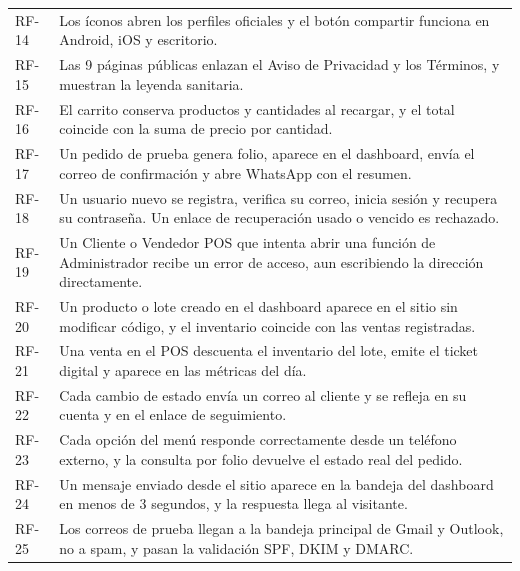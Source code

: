 \documentclass[11pt,letterpaper]{article}
\begin{document}
\begin{longtable}{@{} L{1.9cm} L{13.9cm} @{}}
RF-14 & Los íconos abren los perfiles oficiales y el botón compartir funciona en Android, iOS y escritorio. \\
RF-15 & Las 9 páginas públicas enlazan el Aviso de Privacidad y los Términos, y muestran la leyenda sanitaria. \\
RF-16 & El carrito conserva productos y cantidades al recargar, y el total coincide con la suma de precio por cantidad. \\
RF-17 & Un pedido de prueba genera folio, aparece en el dashboard, envía el correo de confirmación y abre WhatsApp con el resumen. \\
RF-18 & Un usuario nuevo se registra, verifica su correo, inicia sesión y recupera su contraseña. Un enlace de recuperación usado o vencido es rechazado. \\
RF-19 & Un Cliente o Vendedor POS que intenta abrir una función de Administrador recibe un error de acceso, aun escribiendo la dirección directamente. \\
RF-20 & Un producto o lote creado en el dashboard aparece en el sitio sin modificar código, y el inventario coincide con las ventas registradas. \\
RF-21 & Una venta en el POS descuenta el inventario del lote, emite el ticket digital y aparece en las métricas del día. \\
RF-22 & Cada cambio de estado envía un correo al cliente y se refleja en su cuenta y en el enlace de seguimiento. \\
RF-23 & Cada opción del menú responde correctamente desde un teléfono externo, y la consulta por folio devuelve el estado real del pedido. \\
RF-24 & Un mensaje enviado desde el sitio aparece en la bandeja del dashboard en menos de 3 segundos, y la respuesta llega al visitante. \\
RF-25 & Los correos de prueba llegan a la bandeja principal de Gmail y Outlook, no a spam, y pasan la validación SPF, DKIM y DMARC. \\
\end{longtable}
\normalsize
\end{document}
